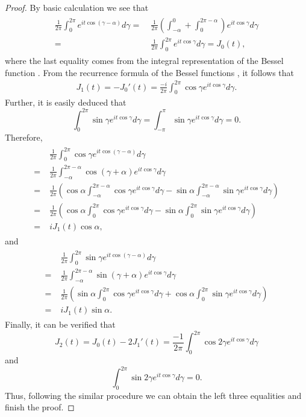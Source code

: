 \documentclass[final,reqno]{siamltex}
\newcommand{\ben}{\begin{eqnarray*}}
\newcommand{\enn}{\end{eqnarray*}}
\begin{document}
\begin{proof}
	By basic calculation we see that 
	\ben
	  \begin{aligned}
	  	\frac{1}{2\pi}\int_{0}^{2\pi}e^{it\cos(\gamma-\alpha)}d\gamma=&\;\frac{1}{2\pi}\left(\int_{-\alpha}^{0}+\int_{0}^{2\pi-\alpha}\right)e^{it\cos\gamma}d\gamma \\
	  =&\;\frac{1}{2\pi}\int_{0}^{2\pi}e^{it\cos\gamma}d\gamma=J_0(t), 
	  \end{aligned}
	\enn
	where the last equality comes from the integral representation of the Bessel function \cite{GN95}. From the recurrence formula of the Bessel functions \cite{GN95}, it follows that 
	\begin{align*}
	  J_1(t)=-J_0'(t)=\frac{-i}{2\pi}\int_{0}^{2\pi}\cos\gamma e^{it\cos\gamma}d\gamma. 
	\end{align*}
	Further, it is easily deduced that 
	$$
	  \int_{0}^{2\pi}\sin\gamma e^{it\cos\gamma}d\gamma=\int_{-\pi}^{\pi}\sin\gamma e^{it\cos\gamma}d\gamma=0. 
	$$
	Therefore, 
	\ben
	  \begin{aligned}
	  	&\;\frac{1}{2\pi}\int_{0}^{2\pi}\cos\gamma e^{it\cos(\gamma-\alpha)}d\gamma \\
	  =&\;\frac{1}{2\pi}\int_{-\alpha}^{2\pi-\alpha}\cos(\gamma+\alpha)e^{it\cos\gamma}d\gamma \\
	  =&\;\frac{1}{2\pi}\left(\cos\alpha\int_{-\alpha}^{2\pi-\alpha}\cos\gamma e^{it\cos\gamma}d\gamma-\sin\alpha\int_{-\alpha}^{2\pi-\alpha}\sin\gamma e^{it\cos\gamma}d\gamma\right) \\
	  =&\;\frac{1}{2\pi}\left(\cos\alpha\int_{0}^{2\pi}\cos\gamma e^{it\cos\gamma}d\gamma-\sin\alpha\int_{0}^{2\pi}\sin\gamma e^{it\cos\gamma}d\gamma\right) \\
	  =&\;iJ_1(t)\cos\alpha, 
	  \end{aligned}
	\enn
	and 
	\ben
	  \begin{aligned}
	  	&\;\frac{1}{2\pi}\int_{0}^{2\pi}\sin\gamma e^{it\cos(\gamma-\alpha)}d\gamma \\
	  =&\;\frac{1}{2\pi}\int_{-\alpha}^{2\pi-\alpha}\sin(\gamma+\alpha)e^{it\cos\gamma}d\gamma \\
	  =&\;\frac{1}{2\pi}\left(\sin\alpha\int_{0}^{2\pi}\cos\gamma e^{it\cos\gamma}d\gamma+\cos\alpha\int_{0}^{2\pi}\sin\gamma e^{it\cos\gamma}d\gamma\right) \\
	  =&\;iJ_1(t)\sin\alpha. 
	  \end{aligned}
	\enn
	Finally, it can be verified that 
	$$
	  J_2(t)=J_0(t)-2J_1'(t)=\frac{-1}{2\pi}\int_{0}^{2\pi}\cos2\gamma e^{it\cos\gamma}d\gamma
	$$
	and
	$$
	  \int_{0}^{2\pi}\sin2\gamma e^{it\cos\gamma}d\gamma=0. 
	$$
	Thus, following the similar procedure we can obtain the left three equalities and finish the proof. 
\end{proof}
\end{document}
